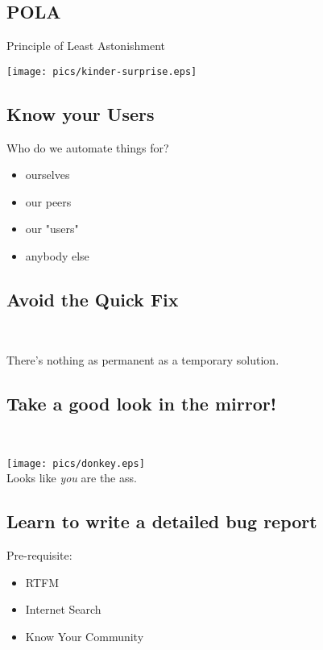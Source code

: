 \documentclass[xga]{xdvislides}
\begin{document}
\subsection{POLA}
Principle of Least Astonishment
\\
\vspace*{\fill}
\begin{center}
	\texttt{[image: pics/kinder-surprise.eps]}
\end{center}
\vspace*{\fill}

\subsection{Know your Users}
Who do we automate things for?
\begin{itemize}
	\item ourselves
	\item our peers
	\item our "users"
	\item anybody else
\end{itemize}

\subsection{Avoid the Quick Fix}
\\
\Huge
\begin{center}
	There's nothing as permanent as a temporary solution.
\end{center}
\Normalsize

\subsection{Take a good look in the mirror!}
\\
\vspace*{\fill}
\begin{center}
	\texttt{[image: pics/donkey.eps]} \\
	\small
	Looks like {\em you} are the ass.
\end{center}
\vspace*{\fill}

\subsection{Learn to write a detailed bug report}
Pre-requisite:
\begin{itemize}
	\item RTFM
	\item Internet Search
	\item Know Your Community
\end{itemize}
\end{document}
